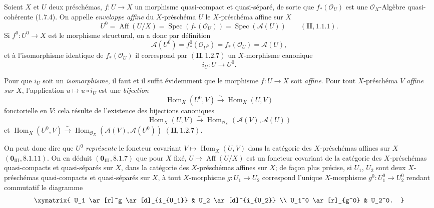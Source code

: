 \begin{env}[21.12.1]
Soient $X$ et $U$ deux préschémas, $f:U\to X$ un morphisme quasi-compact et
quasi-séparé, de sorte que $f_*(\mathcal O_U)$ est une $\mathcal O_X$-Algèbre
quasi-cohérente (1.7.4). On appelle \emph{enveloppe affine} du $X$-préschéma $U$ le
$X$-préschéma affine sur $X$
\[
  U^0=\operatorname{Aff}(U/X)=\operatorname{Spec}(f_*(\mathcal O_U))
  =\operatorname{Spec}(\mathscr A(U))\qquad(\mathbf{II}, 1.1.1).
\]
Si $f^0:U^0\to X$ est le morphisme structural, on a donc par définition
\[
  \mathscr A(U^0)=f^0_*(\mathcal O_{U^0})=f_*(\mathcal O_U)=\mathscr A(U),
\]
et à l'isomorphisme identique de $f_*(\mathcal O_U)$ il correspond par
$(\mathbf{II}, 1.2.7)$ un $X$-morphisme canonique
\[
\label{IV.21.12.1.1}
  i_U:U\to U^0.
  \tag{21.12.1.1}
\]

Pour que $i_U$ soit un \emph{isomorphisme}, il faut et il suffit évidemment que le
morphisme $f:U\to X$ soit \emph{affine}. Pour tout $X$-préschéma $V$ \emph{affine sur
$X$}, l'application $u\mapsto u\circ i_U$ est une \emph{bijection}
\[
  \operatorname{Hom}_X(U^0,V)\xrightarrow{\sim}\operatorname{Hom}_X(U,V)
\]
fonctorielle en $V$: cela résulte de l'existence des bijections canoniques
\[
  \operatorname{Hom}_X(U,V)\xrightarrow{\sim}
  \operatorname{Hom}_{\mathcal O_X}(\mathscr A(V),\mathscr A(U))
\]
et
$\operatorname{Hom}_X(U^0,V)\xrightarrow{\sim}
\operatorname{Hom}_{\mathcal O_X}(\mathscr A(V),\mathscr A(U^0))$
$(\mathbf{II}, 1.2.7)$.

On peut donc dire que $U^0$ \emph{représente} le foncteur covariant
$V\mapsto\operatorname{Hom}_X(U,V)$ dans la catégorie des $X$-préschémas affines sur
$X$ $(\mathbf 0_{\mathrm{III}}, 8.1.11)$. On en déduit
$(\mathbf 0_{\mathrm{III}}, 8.1.7)$ que pour $X$ fixé,
$U\mapsto\operatorname{Aff}(U/X)$ est un foncteur covariant de la catégorie des
$X$-préschémas quasi-compacts et quasi-séparés sur $X$, dans la catégorie des
$X$-préschémas affines sur $X$; de façon plus précise, si $U_1$, $U_2$ sont deux
$X$-préschémas quasi-compacts et quasi-séparés sur $X$, à tout $X$-morphisme
$g:U_1\to U_2$ correspond l'unique $X$-morphisme $g^0:U_1^0\to U_2^0$ rendant
commutatif le diagramme
\[
  \xymatrix{
    U_1 \ar[r]^g \ar[d]_{i_{U_1}} & U_2 \ar[d]^{i_{U_2}} \\
    U_1^0 \ar[r]_{g^0} & U_2^0.
  }
\]
\end{env}

